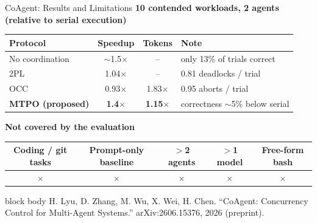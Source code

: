 \documentclass[aspectratio=169,11pt]{beamer}
\newcommand{\papercite}[1]{%
  \vfill
  \begin{beamercolorbox}[wd=\textwidth,sep=3pt]{block body}
    \tiny #1
  \end{beamercolorbox}}
\newcommand{\no}{\textcolor{red!70!black}{$\times$}}
\begin{document}
\begin{frame}{CoAgent: Results and Limitations}
  \centering\footnotesize\textbf{10 contended workloads, 2 agents (relative to serial execution)}\\[4pt]
  \small
  \begin{tabular}{lccl}
    \toprule
    Protocol & Speedup & Tokens & Note \\
    \midrule
    No coordination & $\sim$1.5$\times$ & -- & only 13\% of trials correct \\
    2PL & 1.04$\times$ & -- & 0.81 deadlocks / trial \\
    OCC & 0.93$\times$ & 1.83$\times$ & 0.95 aborts / trial \\
    \textbf{MTPO (proposed)} & \textbf{1.4$\times$} & \textbf{1.15$\times$} & correctness $\sim$5\% below serial \\
    \bottomrule
  \end{tabular}

  \vspace{0.8em}
  \footnotesize\textbf{Not covered by the evaluation}\\[3pt]
  \begin{tabular}{ccccc}
    \toprule
    Coding / git tasks & Prompt-only baseline & $>$2 agents & $>$1 model & Free-form bash \\
    \midrule
    \no & \no & \no & \no & \no \\
    \bottomrule
  \end{tabular}
  \papercite{H. Lyu, D. Zhang, M. Wu, X. Wei, H. Chen. ``CoAgent: Concurrency Control for Multi-Agent Systems.'' arXiv:2606.15376, 2026 (preprint).}
\end{frame}

\end{document}

